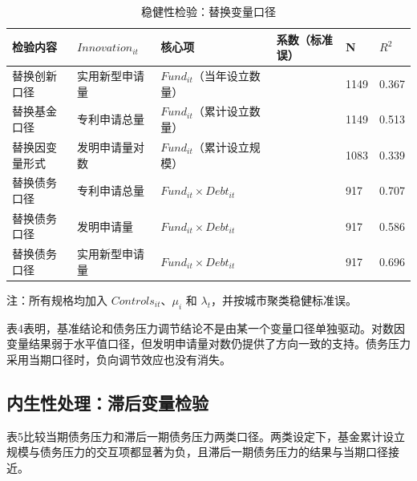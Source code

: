 \begin{table}[htbp]
  \centering
  \caption{稳健性检验：替换变量口径}
  {\ERJTableFont
  \begin{tabular}{@{}L{2.0cm} L{2.3cm} L{3.4cm} C{2.9cm} C{0.95cm} C{0.95cm}@{}}
    \toprule
    检验内容 & $Innovation_{it}$ & 核心项 & 系数（标准误） & N & $R^2$ \\
    \midrule
    替换创新口径 & 实用新型申请量 & $Fund_{it}$（当年设立数量） &  & 1149 & 0.367 \\
    替换基金口径 & 专利申请总量 & $Fund_{it}$（累计设立数量） &  & 1149 & 0.513 \\
    替换因变量形式 & 发明申请量对数 & $Fund_{it}$（累计设立规模） &  & 1083 & 0.339 \\
    替换债务口径 & 专利申请总量 & $Fund_{it}\times Debt_{it}$ &  & 917 & 0.707 \\
    替换债务口径 & 发明申请量 & $Fund_{it}\times Debt_{it}$ &  & 917 & 0.586 \\
    替换债务口径 & 实用新型申请量 & $Fund_{it}\times Debt_{it}$ &  & 917 & 0.696 \\
    \bottomrule
  \end{tabular}

  \par\smallskip
  {\ERJTableNoteFont 注：所有规格均加入 $Controls_{it}$、$\mu_i$ 和 $\lambda_t$，并按城市聚类稳健标准误。}
  }
\end{table}

表4表明，基准结论和债务压力调节结论不是由某一个变量口径单独驱动。对数因变量结果弱于水平值口径，但发明申请量对数仍提供了方向一致的支持。债务压力采用当期口径时，负向调节效应也没有消失。

\subsection{内生性处理：滞后变量检验}

表5比较当期债务压力和滞后一期债务压力两类口径。两类设定下，基金累计设立规模与债务压力的交互项都显著为负，且滞后一期债务压力的结果与当期口径接近。

